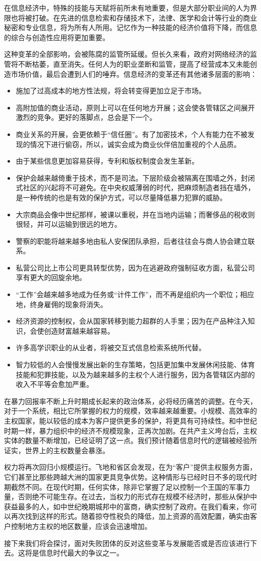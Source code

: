 在信息经济中，特殊的技能与天赋将前所未有地重要，但是大部分职业间的人为界限也将被打破。在先进的信息检索和存储技术下，法律、医学和会计等行业的商业秘密和专业信息，将为所有人所用。记忆作为一种技能的经济价值将下降，而信息的综合与创造性应用将更加重要。

这种变革的全部影响，会被陈腐的监管所延缓。但长久来看，政府对网络经济的监管将不断枯萎，直至消失。任何人为的职业垄断和监管，提高了经营成本又未能创造市场价值，最后会遭到人们的唾弃。信息经济的变革还有其他诸多层面的影响：

\begin{itemize}
    \item 施加了过高成本的地方性法规，将会转变得更加立足于市场。
    \item 高附加值的商业活动，原则上可以在任何地方开展；这会使各管辖区之间展开激烈的竞争。更好的落脚点，总会是下一个。
    \item 商业关系的开展，会更依赖于“信任圈”。有了加密技术，个人有能力在不被发现的情况下进行偷窃，所以，诚实会成为商业伙伴倍加重视的个人品质。
    \item 由于某些信息更加容易获得，专利和版权制度会发生革新。
    \item 保护会越来越倚重于技术，而不是司法。下层阶级会被隔离在围墙之外，封闭式社区的兴起将不可避免。在中央权威薄弱的时代，把麻烦制造者挡在墙外，是一种传统的也是有效的保护方式，可以尽量降低暴力犯罪的威胁。
    \item 大宗商品会像中世纪那样，被课以重税，并在当地内运输；而奢侈品的税收则很轻，并可以运输到很远的地方。
    \item 警察的职能将越来越多地由私人安保团队承担，后者往往会与商人协会建立联系。
    \item 私营公司比上市公司更具转型优势，因为在逃避政府强制征收方面，私营公司享有更大的回旋余地。
    \item “工作”会越来越多地成为任务或“计件工作”，而不再是组织内一个职位；相应地，终身雇佣的现象将消失。
    \item 经济资源的控制权，会从国家转移到能力超群的人手里；因为在产品种注入知识，会使创造财富越来越容易。
    \item 许多高学识职业的从业者，将被交互式信息检索系统所代替。
    \item 智力较低的人会慢慢发展出新的生存策略，包括更加集中发展休闲技能、体育技能和犯罪技能，以及为越来越多的主权个人进行服务，因为各管辖区内部的收入不平等会愈加严重。
\end{itemize}

在暴力回报率不断上升时期成长起来的政治体系，必将经历痛苦的调整。在今天，对于一个系统，相比它所掌握的权力的规模，效率越来越重要。小规模、高效率的主权国家，能以较低的成本为客户提供更多的保护，将更具有可持续性。和中世纪时期一样，暴力组织中的经济不规模现象，正再次加剧。在共产主义垮台后，主权实体的数量不断增加，已经证明了这一点。我们预计随着信息时代的逻辑被经验所证实，世界上的主权数量会暴涨。

权力将再次回归小规模运行。飞地和省区会发现，在为“客户”提供主权服务方面，它们甚至比那些跨越大洲的国家更具竞争优势。这种情形与已经时日不多的现代时期截然不同。在现代时期，任何实体，除非它掌握了足以控制一个王国的军事力量，否则绝不可能生存。在过去，当权力的形式存在规模不经济时，那些从保护中获益最多的人，如中世纪晚期城邦中的富商，确实控制了政府。在我们看来，你可以再次找到这样的形式。随着掠夺性税负的降低，加上资源的高效配置，确实由客户控制地方主权的地区数量，应该会迅速增加。

接下来我们将会探讨，面对失败团体的反对这些变革与发展能否或是否应该进行下去。这将是信息时代最大的争议之一。